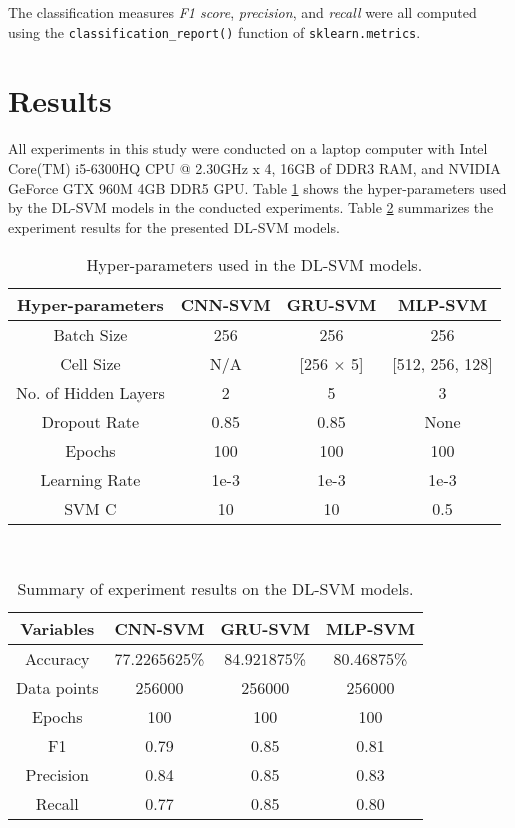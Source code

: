 \documentclass[sigconf]{acmart}
\begin{document}
The classification measures \textit{F1 score}, \textit{precision}, and \textit{recall} were all computed using the \texttt{classification\_report()} function of \texttt{sklearn.metrics}\cite{scikit-learn}.

\section{Results}
All experiments in this study were conducted on a laptop computer with Intel Core(TM) i5-6300HQ CPU @ 2.30GHz x 4, 16GB of DDR3 RAM, and NVIDIA GeForce GTX 960M 4GB DDR5 GPU. Table \ref{table: hyper-parameters} shows the hyper-parameters used by the DL-SVM models in the conducted experiments. Table \ref{table: summary-results} summarizes the experiment results for the presented DL-SVM models.
\begin{table}[htb!]
\centering
\caption{Hyper-parameters used in the DL-SVM models.}
		\begin{tabular}{cccc}
		\toprule
		Hyper-parameters & CNN-SVM & GRU-SVM & MLP-SVM \\
		\midrule
		Batch Size & 256 & 256 & 256 \\
		Cell Size & N/A & [256 $\times$ 5] & [512, 256, 128] \\
		No. of Hidden Layers & 2 & 5 & 3 \\
		Dropout Rate & 0.85 & 0.85 & None \\
		Epochs & 100 & 100 & 100 \\
		Learning Rate & 1e-3 & 1e-3 & 1e-3 \\
		SVM C & 10 & 10 & 0.5 \\
		\bottomrule
		\end{tabular}\\
		\label{table: hyper-parameters}
\end{table}

\begin{table}
\centering
\caption{Summary of experiment results on the DL-SVM models.}
		\begin{tabular}{cccc}
		\toprule
		Variables & CNN-SVM & GRU-SVM & MLP-SVM \\
		\midrule
		Accuracy & 77.2265625\% & 84.921875\% & 80.46875\% \\
		Data points  & 256000 & 256000 & 256000 \\
		Epochs & 100 & 100 & 100 \\
		F1 & 0.79 & 0.85 & 0.81 \\
		Precision & 0.84 & 0.85 & 0.83 \\
		Recall & 0.77 & 0.85 & 0.80 \\ 
		\bottomrule
		\end{tabular}\\
		\label{table: summary-results}
\end{table}
\end{document}
